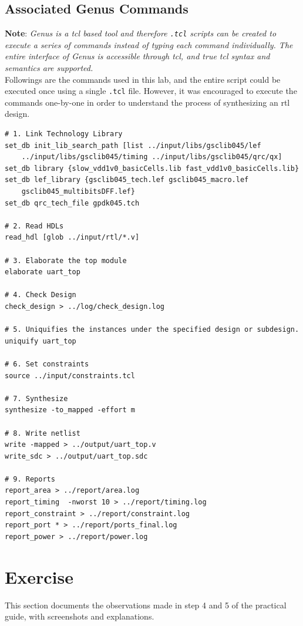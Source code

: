 \documentclass[a4paper,11pt]{article}%
\begin{document}
\pagebreak
\subsection{Associated Genus Commands}

\textbf{Note}: \textit{Genus is a \ac{tcl} based tool and therefore {\tt .tcl} scripts can be created to execute a series of commands instead of typing each command individually. The entire interface of Genus is accessible through \ac{tcl}, and true \ac{tcl} syntax and semantics are supported.}\\

Followings are the commands used in this lab, and the entire script could be executed once using a single {\tt .tcl} file. However, it was encouraged to execute the commands one-by-one in order to understand the process of synthesizing an \ac{rtl} design.
\vspace{2cm}
\begin{Verbatim}[frame=single]
# 1. Link Technology Library
set_db init_lib_search_path [list ../input/libs/gsclib045/lef
    ../input/libs/gsclib045/timing ../input/libs/gsclib045/qrc/qx]
set_db library {slow_vdd1v0_basicCells.lib fast_vdd1v0_basicCells.lib}
set_db lef_library {gsclib045_tech.lef gsclib045_macro.lef
    gsclib045_multibitsDFF.lef}
set_db qrc_tech_file gpdk045.tch

# 2. Read HDLs
read_hdl [glob ../input/rtl/*.v]

# 3. Elaborate the top module
elaborate uart_top

# 4. Check Design
check_design > ../log/check_design.log

# 5. Uniquifies the instances under the specified design or subdesign.
uniquify uart_top

# 6. Set constraints
source ../input/constraints.tcl

# 7. Synthesize 
synthesize -to_mapped -effort m

# 8. Write netlist
write -mapped > ../output/uart_top.v
write_sdc > ../output/uart_top.sdc

# 9. Reports
report_area > ../report/area.log
report_timing  -nworst 10 > ../report/timing.log
report_constraint > ../report/constraint.log
report_port * > ../report/ports_final.log
report_power > ../report/power.log
\end{Verbatim}

\pagebreak
\section{Exercise}
This section documents the observations made in step 4 and 5 of the practical guide, with screenshots and explanations.\\
\end{document}
